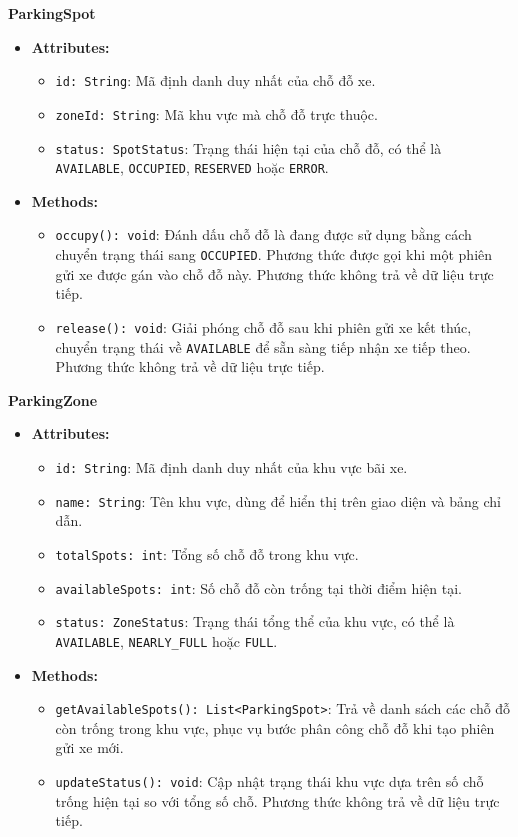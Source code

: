 \noindent\textbf{ParkingSpot}
\begin{itemize}
	\item \textbf{Attributes:}
	\begin{itemize}
		\item \texttt{id: String}: Mã định danh duy nhất của chỗ đỗ xe.
		\item \texttt{zoneId: String}: Mã khu vực mà chỗ đỗ trực thuộc.
		\item \texttt{status: SpotStatus}: Trạng thái hiện tại của chỗ đỗ, có thể là \texttt{AVAILABLE}, \texttt{OCCUPIED}, \texttt{RESERVED} hoặc \texttt{ERROR}.
	\end{itemize}
	\item \textbf{Methods:}
	\begin{itemize}
		\item \texttt{occupy(): void}: Đánh dấu chỗ đỗ là đang được sử dụng bằng cách chuyển trạng thái sang \texttt{OCCUPIED}. Phương thức được gọi khi một phiên gửi xe được gán vào chỗ đỗ này. Phương thức không trả về dữ liệu trực tiếp.
		\item \texttt{release(): void}: Giải phóng chỗ đỗ sau khi phiên gửi xe kết thúc, chuyển trạng thái về \texttt{AVAILABLE} để sẵn sàng tiếp nhận xe tiếp theo. Phương thức không trả về dữ liệu trực tiếp.
	\end{itemize}
\end{itemize}

\noindent\textbf{ParkingZone}
\begin{itemize}
	\item \textbf{Attributes:}
	\begin{itemize}
		\item \texttt{id: String}: Mã định danh duy nhất của khu vực bãi xe.
		\item \texttt{name: String}: Tên khu vực, dùng để hiển thị trên giao diện và bảng chỉ dẫn.
		\item \texttt{totalSpots: int}: Tổng số chỗ đỗ trong khu vực.
		\item \texttt{availableSpots: int}: Số chỗ đỗ còn trống tại thời điểm hiện tại.
		\item \texttt{status: ZoneStatus}: Trạng thái tổng thể của khu vực, có thể là \texttt{AVAILABLE}, \texttt{NEARLY\_FULL} hoặc \texttt{FULL}.
	\end{itemize}
	\item \textbf{Methods:}
	\begin{itemize}
		\item \texttt{getAvailableSpots(): List<ParkingSpot>}: Trả về danh sách các chỗ đỗ còn trống trong khu vực, phục vụ bước phân công chỗ đỗ khi tạo phiên gửi xe mới.
		\item \texttt{updateStatus(): void}: Cập nhật trạng thái khu vực dựa trên số chỗ trống hiện tại so với tổng số chỗ. Phương thức không trả về dữ liệu trực tiếp.
	\end{itemize}
\end{itemize}

